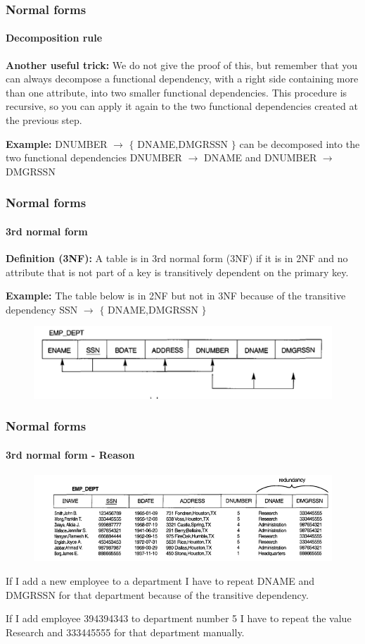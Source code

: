 \documentclass{beamer}
\newcommand{\valseq}[1]{$\lbrace$ #1 $\rbrace$}
\newcommand{\fdep}[2]{#1 $\rightarrow$ #2}
\begin{document}
\begin{frame}
	\frametitle{Normal forms}
	\framesubtitle{Decomposition rule}
	
	\textbf{Another useful trick:}
	We do not give the proof of this, but remember that you can always decompose a functional dependency, with a right side containing more than one attribute, into two smaller functional dependencies. This procedure is recursive, so you can apply it again to the two functional dependencies created at the previous step.
	
	\textbf{Example:}
	\small
	\fdep{DNUMBER}{\valseq{DNAME,DMGRSSN}} can be decomposed into the two functional dependencies \fdep{DNUMBER}{DNAME} and \fdep{DNUMBER}{DMGRSSN}
	
\end{frame}

\begin{frame}
	\frametitle{Normal forms}
	\framesubtitle{3rd normal form}
	
	\textbf{Definition (3NF):}
	A table is in 3rd normal form (3NF) if it is in 2NF and no attribute that is not part of a key is transitively dependent on the primary key.
	
	\textbf{Example:}
	The table below is in 2NF but not in 3NF because of the transitive dependency \fdep{SSN}{\valseq{DNAME,DMGRSSN}}
	\begin{figure}
		\includegraphics[scale=0.4]{img/normalization/norm9}
	\end{figure}
\end{frame}

\begin{frame}
	\frametitle{Normal forms}
	\framesubtitle{3rd normal form - Reason}
	
	\begin{figure}
		\includegraphics[scale=0.4]{img/normalization/norm11}
	\end{figure}
	
	If I add a new employee to a department I have to repeat DNAME and DMGRSSN for that department because of the transitive dependency.
	
	If I add employee 394394343 to department number 5 I have to repeat the value Research and 333445555 for that department manually.	
\end{frame}
\end{document}
